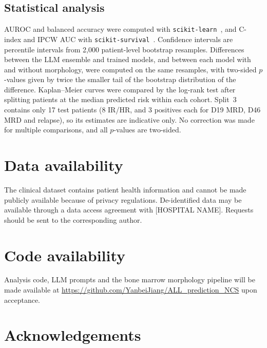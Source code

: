 \documentclass[pdflatex,sn-nature]{sn-jnl}
\begin{document}
\subsection{Statistical analysis}

AUROC and balanced accuracy were computed with
\texttt{scikit-learn}~\cite{[CITE:sklearn]}, and C-index and IPCW AUC
with \texttt{scikit-survival}~\cite{[CITE:sksurv]}.
Confidence intervals are percentile intervals from 2,000 patient-level
bootstrap resamples.
Differences between the LLM ensemble and trained models, and between
each model with and without morphology, were computed on the same
resamples, with two-sided $p$-values given by twice the smaller tail of
the bootstrap distribution of the difference.
Kaplan--Meier curves were compared by the log-rank test after splitting
patients at the median predicted risk within each cohort.
Split~3 contains only 17 test patients (8 IR/HR, and 3 positives each
for D19 MRD, D46 MRD and relapse), so its estimates are indicative
only.
No correction was made for multiple comparisons, and all $p$-values
are two-sided.

\section*{Data availability}

The clinical dataset contains patient health information and cannot be
made publicly available because of privacy regulations.
De-identified data may be available through a data access agreement
with [HOSPITAL NAME].
Requests should be sent to the corresponding author.

\section*{Code availability}

Analysis code, LLM prompts and the bone marrow morphology pipeline
will be made available at
\url{https://github.com/YanbeiJiang/ALL_prediction_NCS}
upon acceptance.

\section*{Acknowledgements}
\end{document}
